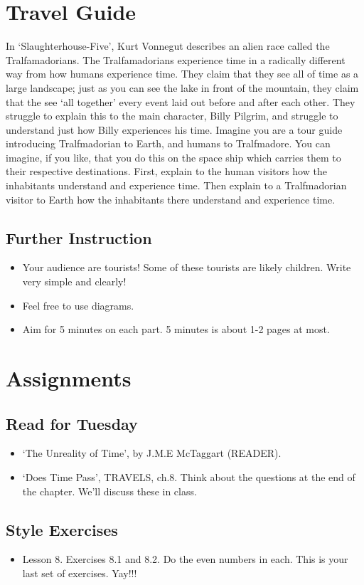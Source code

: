 \documentclass[oneside]{article}
\begin{document}
\thispagestyle{fancy}

\section*{Travel Guide}

In `Slaughterhouse-Five', Kurt Vonnegut describes an alien race called the Tralfamadorians. The Tralfamadorians experience time in a radically different way from how humans experience time. They claim that they see all of time as a large landscape; just as you can see the lake in front of the mountain, they claim that the see `all together' every event laid out before and after each other. They struggle to explain this to the main character, Billy Pilgrim, and struggle to understand just how Billy experiences his time. Imagine you are a tour guide introducing Tralfmadorian to Earth, and humans to Tralfmadore. You can imagine, if you like, that you do this on the space ship which carries them to their respective destinations. First, explain to the human visitors how the inhabitants understand and experience time. Then  explain to a Tralfmadorian visitor to Earth how the inhabitants there understand and experience time. 


\subsection*{Further Instruction}

\begin{itemize} 
\item Your audience are tourists! Some of these tourists are likely children. Write very simple and clearly!  
\item Feel free to use diagrams. 
\item Aim for 5 minutes on each part. 5 minutes is about 1-2 pages at most. 
\end{itemize}
\section*{Assignments}

\subsection*{Read for Tuesday}
\begin{itemize}
\item `The Unreality of Time', by J.M.E McTaggart (READER).
\item  `Does Time Pass', TRAVELS, ch.8. Think about the questions at the end of the chapter. We'll discuss these in class.
\end{itemize}

\subsection*{Style Exercises} 
\begin{itemize}
\item Lesson 8. Exercises 8.1 and 8.2. Do the even numbers in each. This is your last set of exercises. Yay!!! 
\end{itemize}
\end{document}
